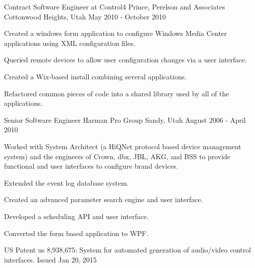 \begin{cventries}
\cventry
{Contract Software Engineer at Control4} %
{Prince, Perelson and Associates} %
{Cottonwood Heights, Utah} %
{May 2010 - October 2010} %
{
	\begin{cvitems} %
		\item {Created a windows \Csh{} form application to configure Windows Media Center applications using XML configuration files.}
		\item {Queried remote devices to allow user configuration changes via a user interface.}
		\item {Created a Wix-based install combining several applications.}
		\item {Refactored common pieces of code into a shared library used by all of the applications.}
	\end{cvitems}
}

\cventry
{Senior Software Engineer} %
{Harman Pro Group} %
{Sandy, Utah} %
{August 2006 - April 2010} %
{
	\begin{cvitems} %
		\item {Worked with System Architect (a HiQNet protocol based device management system) and the engineers of Crown, dbx, JBL, AKG, and BSS to provide functional and user interfaces to configure brand devices.}
		\item {Extended the event log database system.}
		\item {Created an advanced parameter search engine and user interface.}
		\item {Developed a scheduling API and user interface.}
		\item {Converted the \Csh{} form based application to WPF.}
		\item {US Patent us 8,938,675: System for automated generation of audio/video control interfaces. Issued Jan 20, 2015}
	\end{cvitems}
}


\end{cventries}
